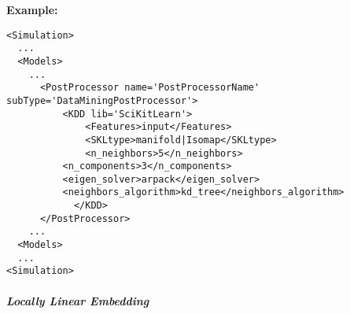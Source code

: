 \textbf{Example:}
\begin{lstlisting}[style=XML,morekeywords={subType}]
<Simulation>
  ...
  <Models>
    ...
      <PostProcessor name='PostProcessorName' subType='DataMiningPostProcessor'>
          <KDD lib='SciKitLearn'>
              <Features>input</Features>
              <SKLtype>manifold|Isomap</SKLtype>
              <n_neighbors>5</n_neighbors>
	      <n_components>3</n_components>
	      <eigen_solver>arpack</eigen_solver>
	      <neighbors_algorithm>kd_tree</neighbors_algorithm>
            </KDD>
      </PostProcessor>
    ...
  <Models>
  ...
<Simulation>
\end{lstlisting}


\subparagraph{Locally Linear Embedding} \hfil \\
\label{subparagraph:LLE}
